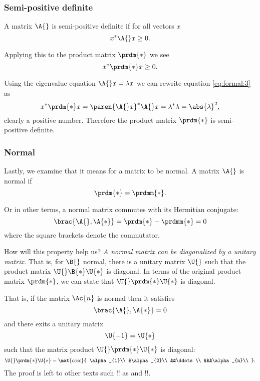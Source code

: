 
\subsubsection{Semi-positive definite}
A matrix $\A{}$ is semi-positive definite if for all vectors $x$
\begin{equation}
  x^{*}\A{}x  \geq  0.
\end{equation}

Applying this to the product matrix $\prdm{*}$ we see
\begin{equation}
  x^{*}\prdm{*}x  \geq  0.
  \label{eq:formal:3}
\end{equation}

Using the eigenvalue equation $\A{}x=\lambda x$ we can rewrite equation \eqref{eq:formal:3} as
\begin{equation}
  x^{*}\prdm{*}x  =  \paren{\A{}x}^{*}\A{}x  =  \lambda^{*}\lambda = \abs{\lambda}^{2},
\end{equation}
clearly a positive number. Therefore the product matrix $\prdm{*}$ is semi-positive definite.


\subsubsection{Normal}

Lastly, we examine that it means for a matrix to be normal. A matrix $\A{}$ is normal if
\begin{equation}
  \prdm{*}  =  \prdmm{*}.
\end{equation}

Or in other terms, a normal matrix commutes with its Hermitian conjugate: 
\begin{equation}
  \brac{ \A{}, \A{*} } = \prdm{*}-\prdmm{*} =  0
\end{equation}
where the square brackets denote the commutator.

How will this property help us? \textit{A normal matrix can be diagonalized by a unitary matrix.} That is, for $\B{}$ normal, there is a unitary matrix $\U{}$ such that the product matrix $\U{}\B{*}\U{*}$ is diagonal. In terms of the original product matrix $\prdm{*}$, we can state that $\U{}\prdm{*}\U{*}$ is diagonal. 

That is, if the matrix $\Ac{n}$ is normal then it satisfies
\begin{equation}
  \brac{ \A{}, \A{*} } = 0
\end{equation}
and there exits a unitary matrix
\begin{equation}
  \U{-1}  =  \U{*}
\end{equation}
such that the matrix product $\U{}\prdm{*}\U{*}$ is diagonal:
\begin{equation}
  \U{}\prdm{*}\U{*} = \mat{cccc}
  {
  \alpha_{1}\\
  &\alpha_{2}\\
  &&\ddots\\
  &&&\alpha_{n}\\
  }.
\end{equation}
The proof is left to other texts such !! as and !!.


